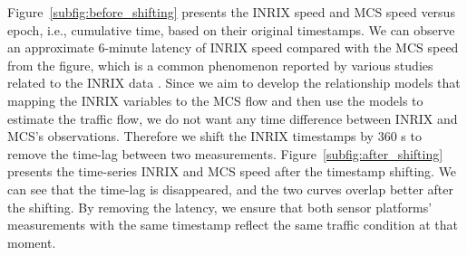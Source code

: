\documentclass[english]{kththesis}
\begin{document}
Figure~\ref{subfig:before_shifting} presents the INRIX speed and MCS speed versus epoch, i.e., cumulative time, based on their original timestamps. We can observe an approximate 6-minute latency of INRIX speed compared with the MCS speed from the figure, which is a common phenomenon reported by various studies related to the INRIX data \cite{kim_inrix_data_comparing, sharma_inrix_data_opportunity}. Since we aim to develop the relationship models that mapping the INRIX variables to the MCS flow and then use the models to estimate the traffic flow, we do not want any time difference between INRIX and MCS's observations. Therefore we shift the INRIX timestamps by 360 s to remove the time-lag between two measurements. Figure~\ref{subfig:after_shifting} presents the time-series INRIX and MCS speed after the timestamp shifting. We can see that the time-lag is disappeared, and the two curves overlap better after the shifting. By removing the latency, we ensure that both sensor platforms' measurements with the same timestamp reflect the same traffic condition at that moment.
\end{document}
